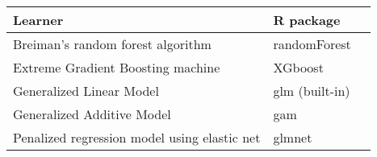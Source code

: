 \documentclass{article}
\begin{document}
\centering
\begin{tabular}{llr}
\toprule
Learner & R package \\
  \midrule
  Breiman's random forest algorithm             & randomForest \cite{randomforest} \\
  Extreme Gradient Boosting machine             & XGboost \cite{xgboost}\\
Generalized Linear Model                      & glm (built-in)          \\
Generalized Additive Model                    & gam       \cite{gam}    \\
Penalized regression model using elastic net  & glmnet \cite{glmnet}      \\

  \bottomrule

\end{tabular}



\end{document}
